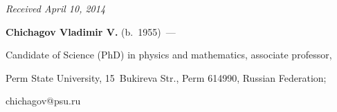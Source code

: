 \hfill{\small\textit{Received April 10, 2014}}




















\Contrl





\noindent


\textbf{Chichagov Vladimir V.} (b.\ 1955)~---


 Candidate of Science (PhD) in physics and mathematics, associate professor, 


 Perm State University, 15~Bukireva Str., Perm 614990, Russian Federation; 


 chichagov@psu.ru





\label{end\stat}








\renewcommand{\bibname}{\protect\rm Литература}


